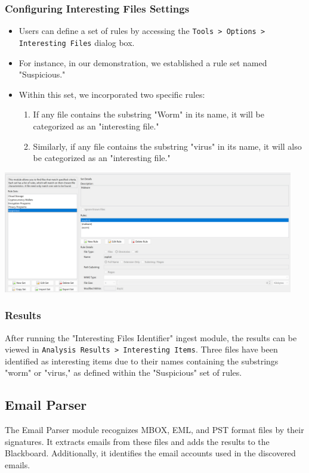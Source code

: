 \documentclass{article}
\begin{document}
\subsubsection*{Configuring Interesting Files Settings}
\begin{itemize}
    \item Users can define a set of rules by accessing the \texttt{Tools > Options > Interesting Files} dialog box.
    \item For instance, in our demonstration, we established a rule set named "Suspicious."
    \item Within this set, we incorporated two specific rules:
    \begin{enumerate}
        \item If any file contains the substring "Worm" in its name, it will be categorized as an "interesting file."
        \item Similarly, if any file contains the substring "virus" in its name, it will also be categorized as an "interesting file."
    \end{enumerate}
\end{itemize}

\begin{center}
    \includegraphics[width=0.95\textwidth]{3/3.8/Interesting Files Configuration.png}
\end{center}

\subsubsection*{Results}
After running the "Interesting Files Identifier" ingest module, the results can be viewed in \texttt{Analysis Results > Interesting Items}. Three files have been identified as interesting items due to their names containing the substrings "worm" or "virus," as defined within the "Suspicious" set of rules.

\subsection{Email Parser}
The Email Parser module recognizes MBOX, EML, and PST format files by their signatures. It extracts emails from these files and adds the results to the Blackboard. Additionally, it identifies the email accounts used in the discovered emails.
\end{document}
